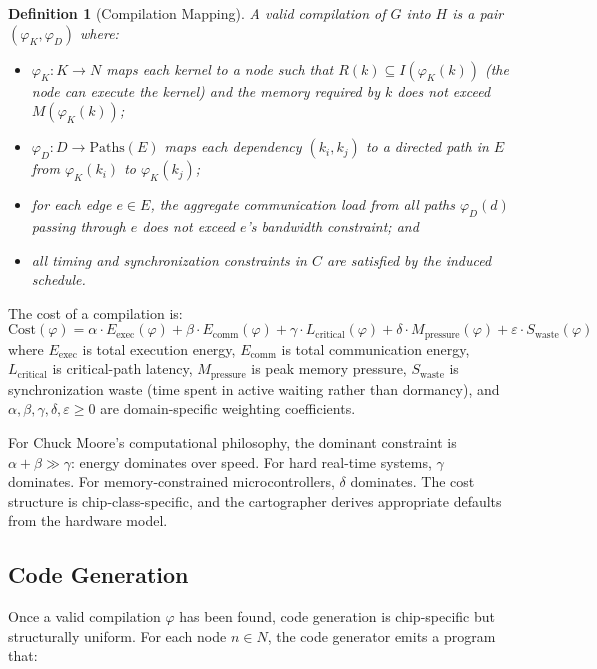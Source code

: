 \documentclass[11pt, a4paper]{article}
\newtheorem{definition}{Definition}
\begin{document}
\begin{definition}[Compilation Mapping]
A \emph{valid compilation} of $G$ into $H$ is a pair $(\varphi_K, \varphi_D)$ where:
\begin{itemize}
  \item $\varphi_K : K \to N$ maps each kernel to a node such that
        $R(k) \subseteq I(\varphi_K(k))$ (the node can execute the kernel) and
        the memory required by $k$ does not exceed $M(\varphi_K(k))$;
  \item $\varphi_D : D \to \text{Paths}(E)$ maps each dependency $(k_i, k_j)$ to
        a directed path in $E$ from $\varphi_K(k_i)$ to $\varphi_K(k_j)$;
  \item for each edge $e \in E$, the aggregate communication load from all paths
        $\varphi_D(d)$ passing through $e$ does not exceed $e$'s bandwidth constraint; and
  \item all timing and synchronization constraints in $C$ are satisfied by the induced
        schedule.
\end{itemize}
\end{definition}

The cost of a compilation is:
\[
\text{Cost}(\varphi) = \alpha \cdot E_{\text{exec}}(\varphi)
+ \beta \cdot E_{\text{comm}}(\varphi)
+ \gamma \cdot L_{\text{critical}}(\varphi)
+ \delta \cdot M_{\text{pressure}}(\varphi)
+ \varepsilon \cdot S_{\text{waste}}(\varphi)
\]
where $E_{\text{exec}}$ is total execution energy, $E_{\text{comm}}$ is total
communication energy, $L_{\text{critical}}$ is critical-path latency,
$M_{\text{pressure}}$ is peak memory pressure, $S_{\text{waste}}$ is synchronization
waste (time spent in active waiting rather than dormancy), and $\alpha, \beta, \gamma,
\delta, \varepsilon \geq 0$ are domain-specific weighting coefficients.

For Chuck Moore's computational philosophy, the dominant constraint is $\alpha + \beta \gg
\gamma$: energy dominates over speed. For hard real-time systems, $\gamma$ dominates.
For memory-constrained microcontrollers, $\delta$ dominates. The cost structure is
chip-class-specific, and the cartographer derives appropriate defaults from the
hardware model.

\subsection{Code Generation}

Once a valid compilation $\varphi$ has been found, code generation is chip-specific
but structurally uniform. For each node $n \in N$, the code generator emits a program
that:
\end{document}
